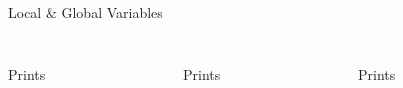         \begin{frame}{Local \& Global Variables}
            \begin{columns}
                \begin{column}{0.33\textwidth}
                    \inputminted[frame=single,framesep=2pt, lastline=15]{python3}{code-examples/var4.py}                    
                    Prints
                \end{column}
                \begin{column}{0.33\textwidth}
                    \inputminted[frame=single,framesep=2pt, lastline=15]{python3}{code-examples/var5.py}                    
                    Prints
                \end{column}
                \begin{column}{0.33\textwidth}
                    \inputminted[frame=single,framesep=2pt, lastline=15]{python3}{code-examples/var6.py}                    
                    Prints
                \end{column}
            \end{columns}
        \end{frame}

